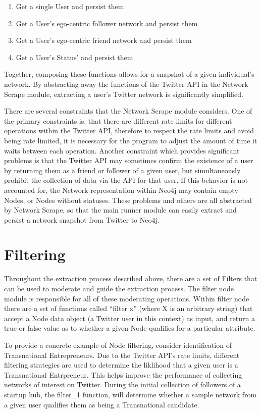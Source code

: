 \begin{enumerate}
\item Get a single User and persist them
\item Get a User's ego-centric follower network and persist them
\item Get a User's ego-centric friend network and persist them
\item Get a User's Status' and persist them
\end{enumerate}

Together, composing these functions allows for a snapshot of a given
individual's network. By abstracting away the functions of the Twitter
API in the Network Scrape module, extracting a user's Twitter network
is significantly simplified.

There are several constraints that the Network Scrape module
considers. One of the primary constraints is, that there are different
rate limits for different operations within the Twitter API, therefore
to respect the rate limits and avoid being rate limited, it is
necessary for the program to adjust the amount of time it waits
between each operation. Another constraint which provides significant
problems is that the Twitter API may sometimes confirm the existence
of a user by returning them as a friend or follower of a given user,
but simultaneously prohibit the collection of data via the API for
that user. If this behavior is not accounted for, the Network
representation within Neo4j may contain empty Nodes, or Nodes without
statuses. These problems and others are all abstracted by Network
Scrape, so that the main runner module can easily extract and persist
a network snapshot from Twitter to Neo4j.

\section{Filtering}
Throughout the extraction process described above, there are a set of
Filters that can be used to moderate and guide the extraction process.
The filter node module is responsible for all of these moderating
operations.  Within filter node there are a set of functions called
``filter x'' (where X is an arbitrary string) that accept a Node data
object (a Twitter user in this context) as input, and return a true or
false value as to whether a given Node qualifies for a particular
attribute.

To provide a concrete example of Node filtering, consider
identification of Transnational Entrepreneurs. Due to the Twitter
API's rate limits, different filtering strategies are used to
determine the liklihood that a given user is a Transnational
Entrpreneur. This helps improve the performance of collecting networks
of interest on Twitter. During the initial collection of followers of
a startup hub, the filter\_1 function, will determine whether a sample
network from a given user qualifies them as being a Transnational
candidate.

